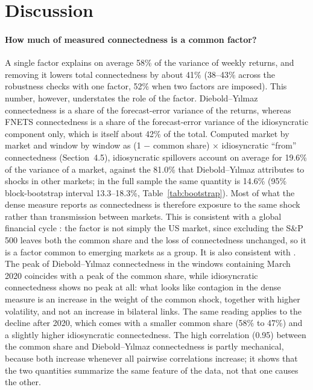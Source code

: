\FloatBarrier
\section{Discussion}

\paragraph{How much of measured connectedness is a common factor?}
A single factor explains on average 58\% of the variance of weekly returns, and removing it lowers total connectedness by about 41\% (38--43\% across the robustness checks with one factor, 52\% when two factors are imposed). This number, however, understates the role of the factor. Diebold--Y{\i}lmaz connectedness is a share of the forecast-error variance of the returns, whereas FNETS connectedness is a share of the forecast-error variance of the idiosyncratic component only, which is itself about 42\% of the total. Computed market by market and window by window as (1 $-$ common share) $\times$ idiosyncratic ``from'' connectedness (Section~4.5), idiosyncratic spillovers account on average for 19.6\% of the variance of a market, against the 81.0\% that Diebold--Y{\i}lmaz attributes to shocks in other markets; in the full sample the same quantity is 14.6\% (95\% block-bootstrap interval 13.3--18.3\%, Table~\ref{tab:bootstrap}). Most of what the dense measure reports as connectedness is therefore exposure to the same shock rather than transmission between markets. This is consistent with a global financial cycle \citep{rey2013dilemma}: the factor is not simply the US market, since excluding the S\&P 500 leaves both the common share and the loss of connectedness unchanged, so it is a factor common to emerging markets as a group. It is also consistent with \citet{forbes2002contagion}. The peak of Diebold--Y{\i}lmaz connectedness in the windows containing March 2020 coincides with a peak of the common share, while idiosyncratic connectedness shows no peak at all: what looks like contagion in the dense measure is an increase in the weight of the common shock, together with higher volatility, and not an increase in bilateral links. The same reading applies to the decline after 2020, which comes with a smaller common share (58\% to 47\%) and a slightly higher idiosyncratic connectedness. The high correlation (0.95) between the common share and Diebold--Y{\i}lmaz connectedness is partly mechanical, because both increase whenever all pairwise correlations increase; it shows that the two quantities summarize the same feature of the data, not that one causes the other.

